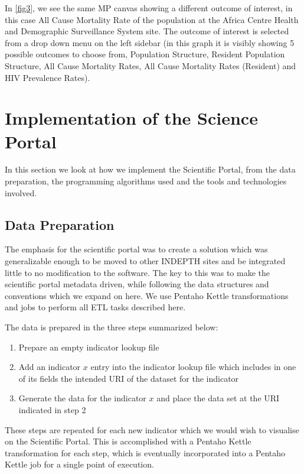 In \ref{fig3}, we see the same MP canvas showing a different outcome of interest, in this case All Cause Mortality Rate of the population at the Africa Centre Health and Demographic Surveillance System site. The outcome of interest is selected from a drop down menu on the left sidebar (in this graph it is visibly showing 5 possible outcomes to choose from, Population Structure, Resident Population Structure, All Cause Mortality Rates, All Cause Mortality Rates (Resident) and HIV Prevalence Rates). 

\section{Implementation of the Science Portal}

In this section we look at how we implement the Scientific Portal, from the data preparation, the programming algorithms used and the tools and technologies involved.

\subsection{Data Preparation}

The emphasis for the scientific portal was to create a solution which was generalizable enough to be moved to other INDEPTH sites and be integrated little to no modification to the software. The key to this was to make the scientific portal metadata driven, while following the data structures and conventions which we expand on here.  We use Pentaho Kettle transformations and jobs to perform all ETL tasks described here. 

The data is prepared in the three steps summarized below:

\begin{enumerate}
 \item Prepare an empty indicator lookup file
 \item Add an indicator $x$ entry into the indicator lookup file which includes in one of its fields the intended URI of the dataset for the indicator
 \item Generate the data for the indicator $x$ and place the data set at the URI indicated in step 2
\end{enumerate}

These steps are repeated for each new indicator which we would wish to visualise on the Scientific Portal. This is accomplished with a Pentaho Kettle transformation for each step, which is eventually incorporated into a Pentaho Kettle job for a single point of execution.

